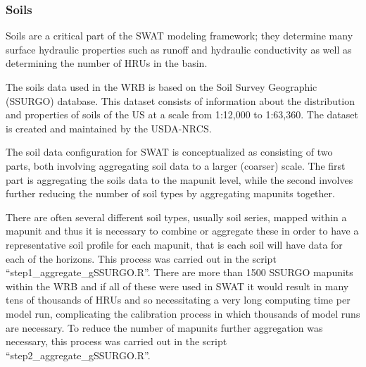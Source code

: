 \subsubsection{Soils}
Soils are a critical part of the SWAT modeling framework; they determine many surface hydraulic properties such as runoff and hydraulic conductivity as well as determining the number of HRUs in the basin.   


The soils data used in the WRB is based on the Soil Survey Geographic (SSURGO) database. This dataset consists of information about the distribution and properties of soils of the US at a scale from 1:12,000 to 1:63,360. The dataset is created and maintained by the USDA-NRCS.

The soil data configuration for SWAT is conceptualized as consisting of two parts, both involving aggregating soil data to a larger (coarser) scale. The first part is aggregating the soils data to the mapunit level, while the second involves further reducing the number of soil types by aggregating mapunits together.		

There are often several different soil types, usually soil series, mapped within a mapunit and thus it is necessary to combine or aggregate these in order to have a representative soil profile for each mapunit, that is each soil will have data for each of the horizons. This process was carried out in the script ``step1\_aggregate\_gSSURGO.R''. There are more than 1500 SSURGO mapunits within the WRB and if all of these were used in SWAT it would result in many tens of thousands of HRUs and so necessitating a very long computing time per model run, complicating the calibration process in which thousands of model runs are necessary. To reduce the number of mapunits further aggregation was necessary, this process was carried out in the script ``step2\_aggregate\_gSSURGO.R''.
 

